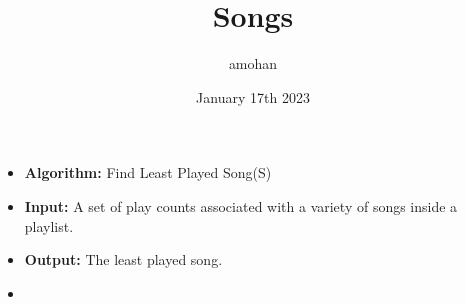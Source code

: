 \documentclass{article}
\title{Songs}
\author{amohan}
\date{January 17th 2023}
\begin{document}
\begin{itemize}
\item[]
\textbf{Algorithm:} Find Least Played Song(S)
\item[]
\textbf{Input:} A set of play counts associated with a variety of songs inside a playlist.
\item[]
\textbf{Output:} The least played song.
\item[]
\scalebox{1}{
\begin{algorithm}[H]
\begin{algorithmic}[1]

\end{algorithmic}
\label{alg:seq}
\end{algorithm}
}
\end{itemize}
\end{document}
